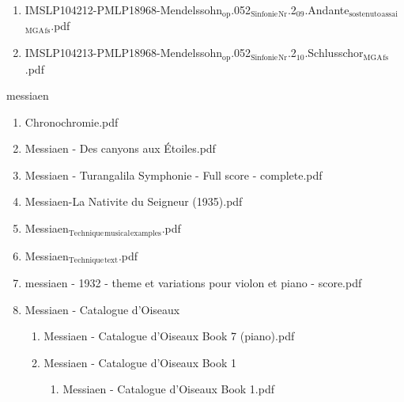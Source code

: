\documentclass[11pt]{article}
\begin{document}
\begin{enumerate}
\begin{enumerate}
\begin{enumerate}
\item IMSLP104212-PMLP18968-Mendelssohn$_{\text{op}}$.052$_{\text{Sinfonie}}$$_{\text{Nr}}$.2$_{\text{09}}$.Andante$_{\text{sostenuto}}$$_{\text{assai}}$$_{\text{MGA}}$$_{\text{fs}}$.pdf
\label{sec-1-1-1-1-44-45-3-5-10}

\item IMSLP104213-PMLP18968-Mendelssohn$_{\text{op}}$.052$_{\text{Sinfonie}}$$_{\text{Nr}}$.2$_{\text{10}}$.Schlusschor$_{\text{MGA}}$$_{\text{fs}}$.pdf
\label{sec-1-1-1-1-44-45-3-5-11}
\end{enumerate}
\end{enumerate}
\end{enumerate}

\item messiaen
\label{sec-1-1-1-1-44-46}
\begin{enumerate}
\item Chronochromie.pdf
\label{sec-1-1-1-1-44-46-1}

\item Messiaen - Des canyons aux Étoiles.pdf
\label{sec-1-1-1-1-44-46-2}

\item Messiaen - Turangalila Symphonie - Full score - complete.pdf
\label{sec-1-1-1-1-44-46-3}

\item Messiaen-La Nativite du Seigneur (1935).pdf
\label{sec-1-1-1-1-44-46-4}

\item Messiaen$_{\text{Technique}}$$_{\text{musical}}$$_{\text{examples}}$.pdf
\label{sec-1-1-1-1-44-46-5}

\item Messiaen$_{\text{Technique}}$$_{\text{text}}$.pdf
\label{sec-1-1-1-1-44-46-6}

\item messiaen - 1932 - theme et variations pour violon et piano - score.pdf
\label{sec-1-1-1-1-44-46-7}

\item Messiaen - Catalogue d'Oiseaux
\label{sec-1-1-1-1-44-46-8}
\begin{enumerate}
\item Messiaen - Catalogue d'Oiseaux Book 7 (piano).pdf
\label{sec-1-1-1-1-44-46-8-1}

\item Messiaen - Catalogue d'Oiseaux Book 1
\label{sec-1-1-1-1-44-46-8-2}
\begin{enumerate}
\item Messiaen - Catalogue d'Oiseaux Book 1.pdf
\label{sec-1-1-1-1-44-46-8-2-1}
\end{enumerate}


\end{enumerate}
\end{enumerate}
\end{document}
